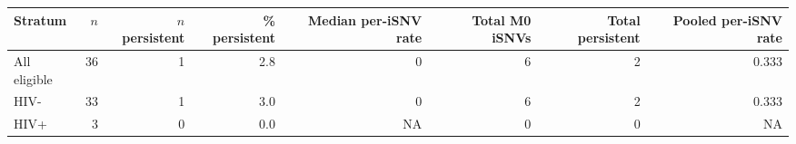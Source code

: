 \begin{tabular}{lrrrrrrr}
\hline
Stratum & $n$ & $n$ persistent & \% persistent & Median per-iSNV rate & Total M0 iSNVs & Total persistent & Pooled per-iSNV rate \\
\hline
All eligible & 36 & 1 & 2.8 &  0 & 6 & 2 & 0.333 \\
HIV- & 33 & 1 & 3.0 &  0 & 6 & 2 & 0.333 \\
HIV+ &  3 & 0 & 0.0 & NA & 0 & 0 & NA \\
\hline
\end{tabular}
